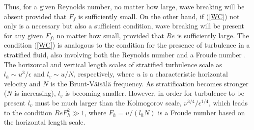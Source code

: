 \documentclass{jfm}
\begin{document}
Thus,  for a given Reynolds number, no matter how large, wave breaking will be absent provided that $ F_f $ is sufficiently small. On the other hand, if (\ref{WC}) not only is a necessary but also a sufficient condition,  wave breaking will be present for any given $ F_f $, no matter how small, provided that $ Re $ is sufficiently large. The condition (\ref{WC}) is analogous to the condition for the presence of turbulence in a stratified fluid, also involving both the Reynolds number and a Froude number \cite[]{Brethouwer2007}. The horizontal and vertical length scales of stratified turbulence scale as $ l_h \sim u^{3}/\epsilon $ and $ l_v \sim u/N $, respectively, where $ u $ is a characteristic horizontal velocity and $ N $ is the Brunt-V\"ais\"al\"a frequency. As stratification becomes stronger ($ N $ is increasing), $ l_v $ is becoming smaller.  However, in order for turbulence to be present $ l_v $ must be much larger than the Kolmogorov scale, $ \nu^{3/4}/\epsilon^{1/4} $, which leads to the condition $ Re F_h^2 \gg 1 $, where $ F_h = u/(l_h N) $ is a Froude number based on the horizontal length scale. 
 
\end{document}
